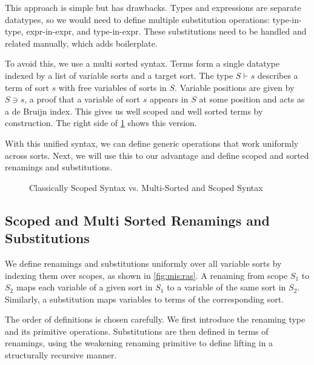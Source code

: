 \documentclass[screen,nonacm]{acmart}
\begin{document}
This approach is simple but has drawbacks. Types and expressions are separate
datatypes, so we would need to define multiple substitution operations:
type-in-type, expr-in-expr, and type-in-expr. These substitutions need to be
handled and related manually, which adds boilerplate.

To avoid this, we use a multi sorted syntax. Terms form a single datatype
indexed by a list of variable sorts and a target sort. The type $S \vdash s$
describes a term of sort $s$ with free variables of sorts in $S$. Variable
positions are given by $S \ni s$, a proof that a variable of sort $s$ appears
in $S$ at some position and acts as a de Bruijn index. This gives us well
scoped and well sorted terms by construction. The right side of
\cref{fig:mis:svm} shows this version.

With this unified syntax, we can define generic operations that work uniformly
across sorts. Next, we will use this to our advantage and define scoped and
sorted renamings and substitutions.

\begin{figure}[h]
      \centering
      \begin{minipage}[t]{0.48\linewidth}
            \raggedright{}
            \EScoped{}
      \end{minipage}
      \hfill
      \begin{minipage}[t]{0.48\linewidth}
            \raggedright{}
            \EMultiSorted{}
      \end{minipage}
      \caption{Classically Scoped Syntax vs. Multi-Sorted and Scoped Syntax}
      \label{fig:mis:svm}
\end{figure}

\subsection{Scoped and Multi Sorted Renamings and Substitutions}
We define renamings and substitutions uniformly over all variable sorts by
indexing them over scopes, as shown in \cref{fig:mis:ras}. A renaming from
scope $S_1$ to $S_2$ maps each variable of a given sort in $S_1$ to a variable
of the same sort in $S_2$. Similarly, a substitution maps variables to terms of
the corresponding sort.

The order of definitions is chosen carefully. We first introduce the renaming
type and its primitive operations. Substitutions are then defined in terms of
renamings, using the weakening renaming primitive to define lifting in a
structurally recursive manner.
\end{document}
